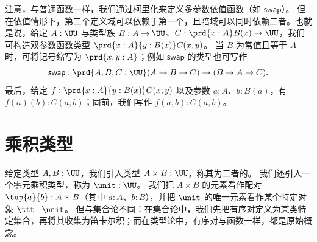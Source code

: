 注意，与普通函数一样，我们通过柯里化来定义多参数依值函数（如 $\mathsf{swap}$）。
但在依值情形下，第二个定义域可以依赖于第一个，且陪域可以同时依赖二者。也就是说，给定 $A:\UU$ 与类型族 $B : A \to \UU$、$C : \prd{x:A}B(x) \to \UU$，我们可构造双参数函数类型 $\prd{x:A}{y : B(x)} C(x,y)$。
当 $B$ 为常值且等于 $A$ 时，可将记号缩写为 $\prd{x,y:A}$；例如 $\mathsf{swap}$ 的类型也可写作
\[ \mathsf{swap} : \prd{A,B,C:\UU} (A\to B\to C) \to (B\to A \to C). \]
最后，给定 $f:\prd{x:A}{y : B(x)} C(x,y)$ 以及参数 $a:A$、$b:B(a)$，有 $f(a)(b) : C(a,b)$；同前，我们写作 $f(a,b) : C(a,b)$。

%
%


\section{乘积类型}
\label{sec:finite-product-types}

给定类型 $A,B:\UU$，我们引入类型 $A\times B:\UU$，称其为二者的。
%
%
%
%
我们还引入一个零元乘积类型，称为 $\unit : \UU$。
%
%
%
我们把 $A\times B$ 的元素看作配对 $\tup{a}{b} : A \times B$（其中 $a:A$、$b:B$），并把 $\unit$ 的唯一元素看作某个特定对象 $\ttt : \unit$。
%
但与集合论不同：在集合论中，我们先把有序对定义为某类特定集合，再将其收集为笛卡尔积；而在类型论中，有序对与函数一样，都是原始概念。   

